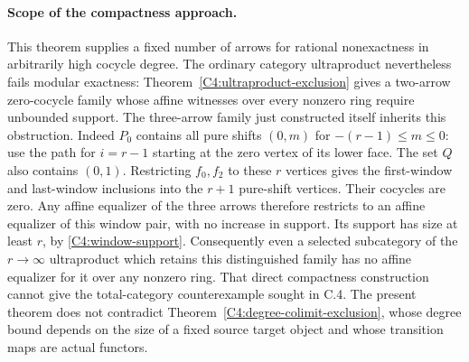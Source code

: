 \paragraph{Scope of the compactness approach.}
This theorem supplies a fixed number of arrows for rational
nonexactness in arbitrarily high cocycle degree. The ordinary
category ultraproduct nevertheless fails modular exactness:
Theorem~\ref{C4:ultraproduct-exclusion} gives a two-arrow
zero-cocycle family whose affine witnesses over every nonzero
ring require unbounded support. The three-arrow family just
constructed itself inherits this obstruction. Indeed $P_0$
contains all pure shifts $(0,m)$ for $-(r-1)\leq m\leq0$:
use the path for $i=r-1$ starting at the zero vertex of its lower
face. The set $Q$ also contains $(0,1)$. Restricting $f_0,f_2$
to these $r$ vertices gives the first-window and last-window
inclusions into the $r+1$ pure-shift vertices. Their cocycles
are zero. Any affine equalizer of the three arrows therefore
restricts to an affine equalizer of this window pair, with no
increase in support. Its support has size at least $r$, by
\eqref{C4:window-support}. Consequently even a selected subcategory of the
$r\to\infty$ ultraproduct which retains this distinguished
family has no affine equalizer for it over any nonzero ring.
That direct compactness construction cannot give the
total-category counterexample sought in C.4.
The present theorem does not contradict
Theorem~\ref{C4:degree-colimit-exclusion}, whose degree bound
depends on the size of a fixed source target object and whose
transition maps are actual functors.
